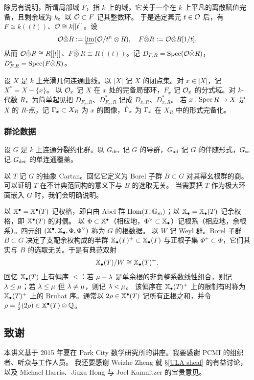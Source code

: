 除另有说明，所谓局部域 $F$，指 $k$ 上的域，它关于一个在 $k$ 上平凡的离散赋值完备，且剩余域为 $k$。以 ${\mathcal O}\subset F$ 记其整数环。
于是选定素元 $t\in{\mathcal O}$ 后，有 $F\cong k((t))$、${\mathcal O}\cong k[[t]]$。设
\[
{\mathcal O}\hat\otimes R:=\varprojlim ({\mathcal O}/t^n\otimes R), \quad F\hat\otimes R:={\mathcal O}\hat\otimes R[1/t],
\]
从而 ${\mathcal O}\hat\otimes R\cong R[[t]]$、$F\hat\otimes R\cong R((t))$。记 $D_{F,R}=\operatorname{Spec} ({\mathcal O}\hat\otimes R)$，$D^*_{F,R}=\operatorname{Spec} (F\hat\otimes R)$。

设 $X$ 是 $k$ 上光滑几何连通曲线。以 $|X|$ 记 $X$ 的闭点集。对 $x\in|X|$，记 $X^*=X-\{x\}$。
以 ${\mathcal O}_x$ 记 $X$ 在 $x$ 处的完备局部环，$F_x$ 记 ${\mathcal O}_x$ 的分式域。对 $k$-代数 $R$，为简单起见把 $D_{F_x,R}$、$D^*_{F_x,R}$ 记成 $D_{x,R}$、$D^*_{x,R}$。
若 $x:\operatorname{Spec} R\to X$ 是 $X$ 的 $R$-点，记 ${\Gamma}_x\subset X_R$ 为 $x$ 的图像，$\hat{{\Gamma}}_x$ 为 ${\Gamma}_x$ 在 $X_R$ 中的形式完备化。

\subsubsection{群论数据}\label{Intro:group}

设 $G$ 是 $k$ 上连通分裂约化群。以 $G_{\operatorname{der}}$ 记 $G$ 的导群，$G_{\operatorname{ad}}$ 记 $G$ 的伴随形式，$G_{\operatorname{sc}}$ 记 $G_{\operatorname{der}}$ 的单连通覆盖。

以 $T$ 记 $G$ 的抽象 Cartan。回忆它定义为 Borel 子群 $B\subset G$ 对其幂幺根群的商。可以证明 $T$ 在不计典范同构的意义下与 $B$ 的选取无关。
当需要把 $T$ 作为极大环面嵌入 $G$ 时，我们会明确说明。

以 $\mathbb{X}^\bullet=\mathbb{X}^\bullet(T)$ 记权格，即自由 Abel 群 ${\operatorname{Hom}}(T,{\mathbb G}_m)$；以 $\mathbb{X}_\bullet=\mathbb{X}_\bullet(T)$ 记余权格，即 $\mathbb{X}^\bullet(T)$ 的对偶。
以 $\Phi\subset\mathbb{X}^\bullet$（相应地，$\Phi^\vee\subset\mathbb{X}_\bullet$）记根系（相应地，余根系）。四元组 $(\mathbb{X}^\bullet,\mathbb{X}_\bullet,\Phi,\Phi^\vee)$ 称为 $G$ 的根数据。
以 $W$ 记 Weyl 群。Borel 子群 $B\subset G$ 决定了支配余权构成的半群 $\mathbb{X}_\bullet(T)^+\subset\mathbb{X}_\bullet(T)$ 与正根子集 $\Phi^+\subset\Phi$，它们其实与 $B$ 的选取无关。于是有典范双射
\[
\mathbb{X}_\bullet(T)/W\cong \mathbb{X}_\bullet(T)^+.
\]
回忆 $\mathbb{X}_\bullet(T)$ 上有偏序 $\leq$：若 $\mu-{\lambda}$ 是单余根的非负整系数线性组合，则记 ${\lambda}\leq\mu$；若 ${\lambda}\leq\mu$ 但 ${\lambda}\neq\mu$，则记 ${\lambda}<\mu$。
该偏序在 $\mathbb{X}_\bullet(T)^+$ 上的限制有时称为 $\mathbb{X}_\bullet(T)^+$ 上的 Bruhat 序。通常以 $2\rho\in\mathbb{X}^\bullet(T)$ 记所有正根之和，并令 $\rho=\frac12(2\rho)\in\mathbb{X}^\bullet(T)\otimes{\mathbb Q}$。

\subsection{致谢}

本讲义基于 2015 年夏在 Park City 数学研究所的讲座。我要感谢 PCMI 的组织者、听众与工作人员。
我还要感谢 Weizhe Zheng 就 \S\ref{ULA sheaf} 的有益讨论，以及 Michael Harris、Jiuzu Hong 与 Joel Kamnitzer 的宝贵意见。

